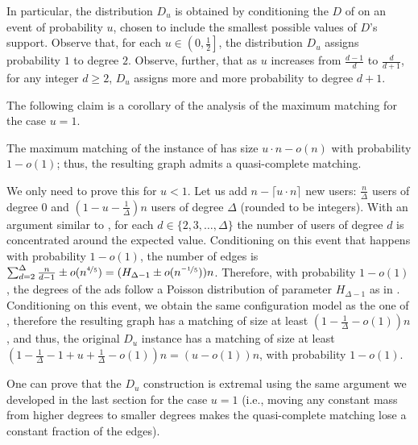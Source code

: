 \documentclass[11pt]{article}
\begin{document}
In particular, the distribution $D_u$ is obtained by conditioning the $D$ of  on an event of probability $u$, chosen to include the smallest possible values of $D$'s support. Observe that, for each $u \in \left(0,\frac12\right]$, the distribution $D_u$ assigns probability $1$ to degree $2$. Observe, further, that as $u$ increases from $\frac{d-1}d$ to $\frac d{d+1}$, for any integer $d \ge 2$, $D_u$ assigns more and more probability to degree $d+1$.

\smallskip

The following claim is a corollary of the analysis of the maximum matching for the case $u=1$.
\begin{corollaryrep}\label{cor:quasi-complete-u}
The maximum matching of the instance of  has size $u \cdot n - o(n)$ with probability $1-o(1)$; thus, the resulting graph admits a quasi-complete matching.
\end{corollaryrep}
\begin{appendixproof}
We only need to prove this for $u<1$. Let us add $n- \lceil u \cdot n\rceil$ new users: $\frac{n}{\Delta}$ users of degree 0 and $(1-u-\frac{1}{\Delta})n$ users of degree $\Delta$ (rounded to be integers). With an argument similar to , for each $d\in\{2,3,\dots, \Delta\}$ the number of users of degree $d$ is concentrated around the expected value. Conditioning on this event that happens with probability $1-o(1)$, the number of edges is $\sum_{d=2}^\Delta \frac{n}{d-1}\pm o(n^{\nicefrac45})=(H_{\Delta-1} \pm o(n^{\nicefrac{-1}5}))n$. Therefore, with probability $1-o(1)$, the degrees of the ads follow a Poisson distribution of parameter $H_{\Delta-1}$ as in . Conditioning on this event, we obtain the same configuration model as the one of , therefore the resulting graph has a matching of size at least $(1-\frac{1}{\Delta}-o(1))n$, and thus, the original $D_u$ instance has a matching of size at least $(1-\frac{1}{\Delta}- 1+u+\frac{1}{\Delta}-o(1))n=(u-o(1))n$, with probability $1-o(1)$.
\end{appendixproof}



One can prove that the $D_u$ construction is extremal using the same argument we developed in the last section for the case $u = 1$ (i.e., moving any constant mass from higher degrees to smaller degrees makes the quasi-complete matching lose a constant fraction of the edges). 
\end{document}
